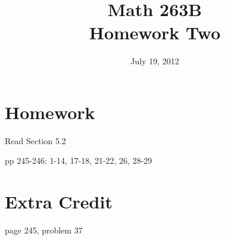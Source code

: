 \documentclass{exam}
\title{Math 263B \\ Homework Two}
\date{July 19, 2012}
\begin{document}
\maketitle

\section{Homework}

\begin{itemize*}
  \item Read Section 5.2
  \item pp 245-246: 1-14, 17-18, 21-22, 26, 28-29
\end{itemize*}

\section{Extra Credit}
page 245, problem 37
\end{document}
